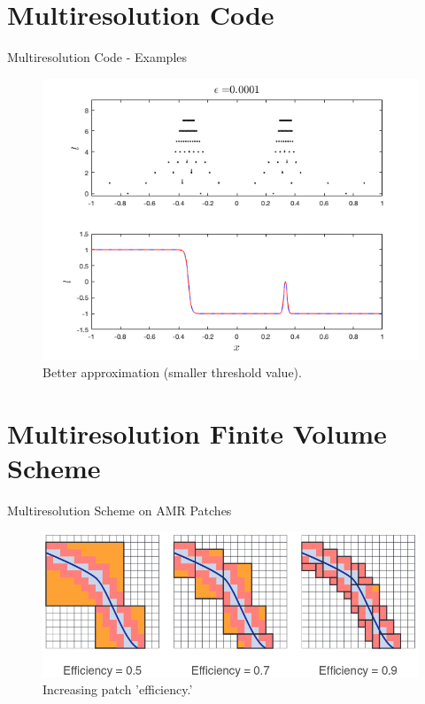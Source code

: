 \documentclass{beamer}
\begin{document}
\section{Multiresolution Code}

\begin{frame}{Multiresolution Code - Examples}
	\begin{figure}
		\center
		\includegraphics[scale=0.5]{plots/spike-med.png}
		\caption{Better approximation (smaller threshold value).}
	\end{figure}
\end{frame}

\section{Multiresolution Finite Volume Scheme}

\begin{frame}{Multiresolution Scheme on AMR Patches}
	\begin{figure}
		\center
		\includegraphics[scale=0.5]{plots/patch-efficiency.png}
		\caption{Increasing patch 'efficiency.'}
	\end{figure}
\end{frame}
\end{document}
